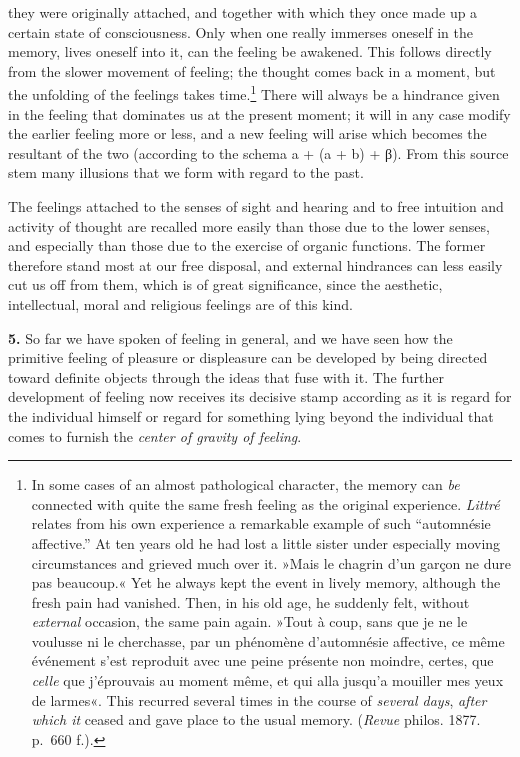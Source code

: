 \documentclass[12pt,a4paper]{book}
\newcommand{\opage}[1]{\marginnote{\footnotesize\textit{[#1]}}}
\begin{document}
they were originally attached, and together with which they once made up
a certain state of consciousness. Only when one really immerses oneself
in the memory, lives oneself into it, can the feeling be awakened. This
follows directly from the slower movement of feeling; the thought comes
back in a moment, but
the unfolding of the feelings takes time.\footnote{In some cases of an
almost pathological character, the memory can \emph{be} connected with
quite the same fresh feeling as the original experience. \emph{Littré}
relates from his own experience a remarkable example of such
``automnésie affective.'' At ten years old he had lost a little sister
under especially moving circumstances and grieved much over it. »Mais le
chagrin d'un garçon ne dure pas beaucoup.« Yet he always kept the event
in lively memory, although the fresh pain had vanished. Then, in his
old age, he suddenly felt, without \emph{external} occasion, the same
pain again. »Tout à coup, sans que je ne le voulusse ni le cherchasse,
par un phénomène d'automnésie affective, ce même événement s'est
reproduit avec une peine présente non moindre, certes, que \emph{celle}
que j'éprouvais au moment même, et qui alla jusqu'a mouiller mes yeux
de larmes«. This recurred several times in the course of \emph{several
days}, \emph{after which it} ceased and gave place to the usual memory.
(\emph{Revue} philos. 1877. p.~660 f.).} There will always be a
\opage{292}hindrance given in the feeling that dominates us at the present
moment; it will in any case modify the earlier feeling more or less, and
a new feeling will arise which becomes the resultant of the two
(according to the schema a + (a + b) + β). From this source stem many
illusions that we form with regard to the past.

The feelings attached to the senses of sight and hearing and to free
intuition and activity of thought are recalled more easily than those
due to the lower senses, and especially than those due to the exercise
of organic functions. The former therefore stand most at our free
disposal, and external hindrances can less easily cut us off from them,
which is of great significance, since the aesthetic, intellectual, moral
and religious feelings are of this kind.

\textbf{5.} So far we have spoken of feeling in general, and we have
seen how the primitive feeling of pleasure or displeasure can be
developed by being directed toward definite objects through the ideas
that fuse with it. The further development of feeling now receives its
decisive stamp according as it is regard for the individual himself or
regard for something lying beyond the individual that comes to furnish
the \emph{center of gravity of feeling}.
\end{document}

